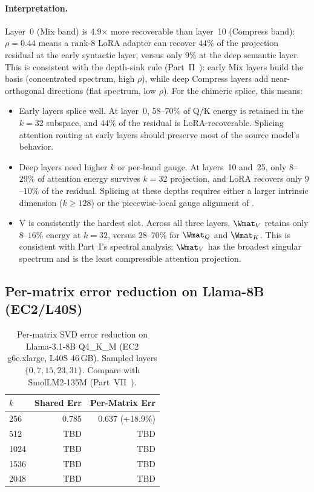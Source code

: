 \documentclass[11pt]{article}
\begin{document}
\paragraph{Interpretation.}  Layer~0 (Mix band) is 4.9$\times$
more recoverable than layer~10 (Compress band): $\rho{=}0.44$ means
a rank-8 LoRA adapter can recover $44\%$ of the projection residual
at the early syntactic layer, versus only $9\%$ at the deep semantic
layer.  This is consistent with the depth-sink rule
(Part~II~\cite{stewart2026gp}): early Mix layers build the basis
(concentrated spectrum, high $\rho$), while deep Compress layers add
near-orthogonal directions (flat spectrum, low $\rho$).  For the
chimeric splice, this means:

\begin{itemize}
\item Early layers splice well.  At layer~0, $58$--$70\%$
      of Q/K energy is retained in the $k{=}32$ subspace, and
      $44\%$ of the residual is LoRA-recoverable.  Splicing
      attention routing at early layers should preserve most
      of the source model's behavior.

\item Deep layers need higher $k$ or per-band gauge.
      At layers~10 and~25, only $8$--$29\%$ of attention energy
      survives $k{=}32$ projection, and LoRA recovers only
      $9$--$10\%$ of the residual.  Splicing at these depths
      requires either a larger intrinsic dimension ($k{\ge}128$)
      or the piecewise-local gauge alignment of
      .

\item V is consistently the hardest slot.  Across all
      three layers, $\Wmat_V$ retains only $8$--$16\%$ energy at
      $k{=}32$, versus $28$--$70\%$ for $\Wmat_Q$ and $\Wmat_K$.
      This is consistent with Part~I's spectral analysis: $\Wmat_V$
      has the broadest singular spectrum and is the least
      compressible attention projection.
\end{itemize}

\subsection{Per-matrix error reduction on Llama-8B (EC2/L40S)}

\begin{table}[h]\centering\small
\caption{Per-matrix SVD error reduction on Llama-3.1-8B Q4\_K\_M
(EC2 g6e.xlarge, L40S 46\,GB).  Sampled layers $\{0,7,15,23,31\}$.
Compare with SmolLM2-135M (Part~VII~\cite{stewart2026ffn}).}
\label{tab:per-matrix-llama8b}
\begin{tabular}{@{}lrr@{}}
\toprule
$k$ & Shared Err & Per-Matrix Err \\
\midrule
256 & 0.785 & 0.637 (+18.9\%) \\
512 & TBD & TBD \\
1024 & TBD & TBD \\
1536 & TBD & TBD \\
2048 & TBD & TBD \\
\bottomrule
\end{tabular}
\end{table}
\end{document}
